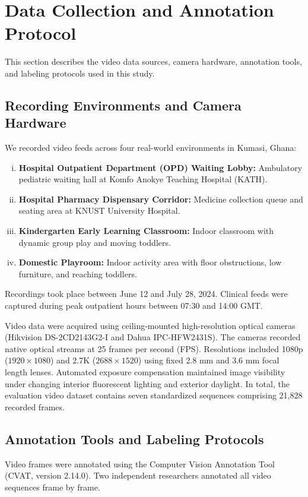\section{Data Collection and Annotation Protocol}
This section describes the video data sources, camera hardware, annotation tools, and labeling protocols used in this study.

\subsection{Recording Environments and Camera Hardware}
We recorded video feeds across four real-world environments in Kumasi, Ghana:
\begin{enumerate}[(i)]
    \item \textbf{Hospital Outpatient Department (OPD) Waiting Lobby:} Ambulatory pediatric waiting hall at Komfo Anokye Teaching Hospital (KATH).
    \item \textbf{Hospital Pharmacy Dispensary Corridor:} Medicine collection queue and seating area at KNUST University Hospital.
    \item \textbf{Kindergarten Early Learning Classroom:} Indoor classroom with dynamic group play and moving toddlers.
    \item \textbf{Domestic Playroom:} Indoor activity area with floor obstructions, low furniture, and reaching toddlers.
\end{enumerate}

Recordings took place between June 12 and July 28, 2024. Clinical feeds were captured during peak outpatient hours between 07:30 and 14:00 GMT.

Video data were acquired using ceiling-mounted high-resolution optical cameras (Hikvision DS-2CD2143G2-I and Dahua IPC-HFW2431S). The cameras recorded native optical streams at 25 frames per second (FPS). Resolutions included 1080p ($1920 \times 1080$) and 2.7K ($2688 \times 1520$) using fixed 2.8 mm and 3.6 mm focal length lenses. Automated exposure compensation maintained image visibility under changing interior fluorescent lighting and exterior daylight. In total, the evaluation video dataset contains seven standardized sequences comprising 21,828 recorded frames.

\subsection{Annotation Tools and Labeling Protocols}
Video frames were annotated using the Computer Vision Annotation Tool (CVAT, version 2.14.0). Two independent researchers annotated all video sequences frame by frame.

